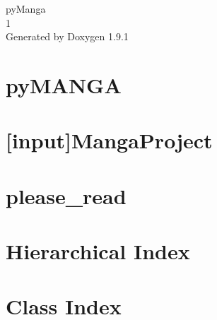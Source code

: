 \let\mypdfximage\pdfximage\def\pdfximage{\immediate\mypdfximage}\documentclass[twoside]{book}
\newcommand{\+}{\discretionary{\mbox{\scriptsize$\hookleftarrow$}}{}{}}
\newcommand{\clearemptydoublepage}{%
  \newpage{\pagestyle{empty}\cleardoublepage}%
}
\begin{document}
\raggedbottom

\hypersetup{pageanchor=false,
             bookmarksnumbered=true,
             pdfencoding=unicode
            }
\begin{titlepage}
\vspace*{7cm}
\begin{center}%
{\Large py\+Manga \\[1ex]\large 1 }\\
\vspace*{1cm}
{\large Generated by Doxygen 1.9.1}\\
\end{center}
\end{titlepage}
\clearemptydoublepage
{}
\tableofcontents
\clearemptydoublepage
{}
\hypersetup{pageanchor=true}

\chapter{py\+MANGA}
\label{index}\hypertarget{index}{}
\chapter{\quad{}\mbox{[}input\mbox{]}Manga\+Project}
\label{project_dox__MangaProject__MangaProject}

\chapter{please\+\_\+read}
\label{md_TreeModelLib_BelowgroundCompetition_OGS_please_read}

\chapter{Hierarchical Index}

\chapter{Class Index}

\end{document}
